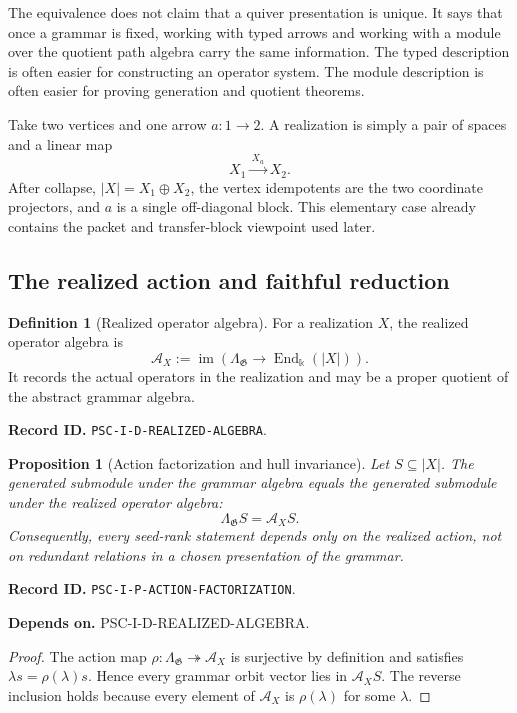 \documentclass[11pt]{article}
\newtheorem{proposition}[proposition]{Proposition}
\theoremstyle{definition}
\newtheorem{definition}[definition]{Definition}
\theoremstyle{remark}
\newcommand{\bbk}{\Bbbk}
\newcommand{\A}{\mathcal A}
\newcommand{\End}{\operatorname{End}}
\newcommand{\im}{\operatorname{im}}
\newcommand{\RecordID}[1]{\par\smallskip\noindent\begingroup\footnotesize\color{PSCGray}\raggedright\textbf{Record ID.} \nolinkurl{#1}.\par\endgroup}
\newcommand{\Depends}[1]{\par\noindent\begingroup\footnotesize\color{PSCGray}\raggedright\textbf{Depends on.} #1\par\endgroup}
\begin{document}
\begin{interpretation}
The equivalence does not claim that a quiver presentation is unique.  It says that once a grammar is fixed, working with typed arrows and working with a module over the quotient path algebra carry the same information.  The typed description is often easier for constructing an operator system.  The module description is often easier for proving generation and quotient theorems.
\end{interpretation}

\begin{microexample}[title={A two-vertex grammar}]
Take two vertices and one arrow \(a:1\to2\).  A realization is simply a pair of spaces and a linear map
\[
X_1\xrightarrow{\,X_a\,}X_2.
\]
After collapse, \(|X|=X_1\oplus X_2\), the vertex idempotents are the two coordinate projectors, and \(a\) is a single off-diagonal block.  This elementary case already contains the packet and transfer-block viewpoint used later.
\end{microexample}


\subsection{The realized action and faithful reduction}
\begin{definition}[Realized operator algebra]
\label{def:realized-algebra}
For a realization $X$, the realized operator algebra is
\[
\A_X:=\im\!\left(\Lambda_{\mathfrak G}\longrightarrow\End_{\bbk}(|X|)\right).
\]
It records the actual operators in the realization and may be a proper quotient of the abstract grammar algebra.
\end{definition}
\RecordID{PSC-I-D-REALIZED-ALGEBRA}

\begin{proposition}[Action factorization and hull invariance]
\label{prop:action-factorization}
Let $S\subseteq |X|$.  The generated submodule under the grammar algebra equals the generated submodule under the realized operator algebra:
\[
\Lambda_{\mathfrak G}S=\A_XS.
\]
Consequently, every seed-rank statement depends only on the realized action, not on redundant relations in a chosen presentation of the grammar.
\end{proposition}
\RecordID{PSC-I-P-ACTION-FACTORIZATION}
\Depends{PSC-I-D-REALIZED-ALGEBRA.}

\begin{proof}
The action map $\rho:\Lambda_{\mathfrak G}\twoheadrightarrow\A_X$ is surjective by definition and satisfies $\lambda s=\rho(\lambda)s$.  Hence every grammar orbit vector lies in $\A_XS$.  The reverse inclusion holds because every element of $\A_X$ is $\rho(\lambda)$ for some $\lambda$.
\end{proof}
\end{document}
